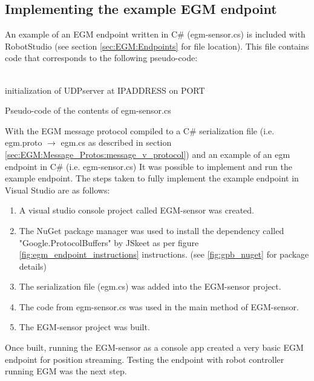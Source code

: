 \documentclass{cslthse-msc}
\begin{document}
\subsection{Implementing the example EGM endpoint}
\label{sec:Dev:I1:ex_endpoint}
An example of an EGM endpoint written in C\# (egm-sensor.cs) is included with RobotStudio (see section \ref{sec:EGM:Endpoints} for file location). This file contains code that corresponds to the following pseudo-code:
\\
\\
\begin{algorithm}[H]
 initialization of UDPserver at IPADDRESS on PORT\;
 \caption{Pseudo-code of the contents of egm-sensor.cs}
\end{algorithm}
$$ $$
With the EGM message protocol compiled to a C\# serialization file (i.e. egm.proto $\rightarrow$ egm.cs as described in section \ref{sec:EGM:Message_Protos:message_v_protocol})  and an example of an egm endpoint in C\# (i.e. egm-sensor.cs) It was possible to implement and run the example endpoint. The steps taken to fully implement the example endpoint in Visual Studio are as follows:
\begin{enumerate}
    \item A visual studio console project called EGM-sensor was created. 
    \item The NuGet package manager was used to install the dependency called "Google.ProtocolBuffers" by JSkeet as per figure \ref{fig:egm_endpoint_instructions} instructions. (see \ref{fig:gpb_nuget} for package details)
    \item The serialization file (egm.cs) was added into the EGM-sensor project.
    \item The code from egm-sensor.cs was used in the main method of EGM-sensor. 
    \item The EGM-sensor project was built.
\end{enumerate}
Once built, running the EGM-sensor as a console app created a very basic EGM endpoint for position streaming. Testing the endpoint with robot controller running EGM was the next step. 
\end{document}
